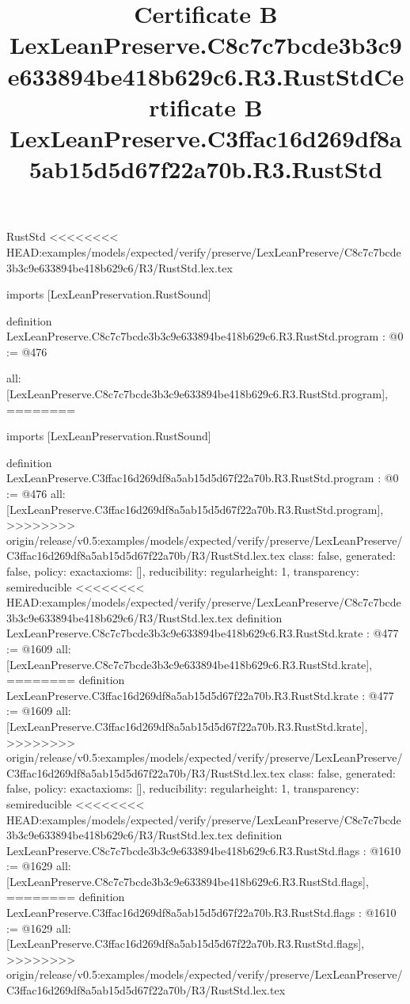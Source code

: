 \begin{lexlean}{RustStd}
<<<<<<<< HEAD:examples/models/expected/verify/preserve/LexLeanPreserve/C8c7c7bcde3b3c9e633894be418b629c6/R3/RustStd.lex.tex
\title{Certificate B LexLeanPreserve.C8c7c7bcde3b3c9e633894be418b629c6.R3.RustStd}
\begin{coremodule}
imports [LexLeanPreservation.RustSound]

definition LexLeanPreserve.C8c7c7bcde3b3c9e633894be418b629c6.R3.RustStd.program : @0 := @476 {
  all: [LexLeanPreserve.C8c7c7bcde3b3c9e633894be418b629c6.R3.RustStd.program],
========
\title{Certificate B LexLeanPreserve.C3ffac16d269df8a5ab15d5d67f22a70b.R3.RustStd}
\begin{coremodule}
imports [LexLeanPreservation.RustSound]

definition LexLeanPreserve.C3ffac16d269df8a5ab15d5d67f22a70b.R3.RustStd.program : @0 := @476 {
  all: [LexLeanPreserve.C3ffac16d269df8a5ab15d5d67f22a70b.R3.RustStd.program],
>>>>>>>> origin/release/v0.5:examples/models/expected/verify/preserve/LexLeanPreserve/C3ffac16d269df8a5ab15d5d67f22a70b/R3/RustStd.lex.tex
  class: false,
  generated: false,
  policy: exact{axioms: []},
  reducibility: regular{height: 1},
  transparency: semireducible
}
<<<<<<<< HEAD:examples/models/expected/verify/preserve/LexLeanPreserve/C8c7c7bcde3b3c9e633894be418b629c6/R3/RustStd.lex.tex
definition LexLeanPreserve.C8c7c7bcde3b3c9e633894be418b629c6.R3.RustStd.krate : @477 := @1609 {
  all: [LexLeanPreserve.C8c7c7bcde3b3c9e633894be418b629c6.R3.RustStd.krate],
========
definition LexLeanPreserve.C3ffac16d269df8a5ab15d5d67f22a70b.R3.RustStd.krate : @477 := @1609 {
  all: [LexLeanPreserve.C3ffac16d269df8a5ab15d5d67f22a70b.R3.RustStd.krate],
>>>>>>>> origin/release/v0.5:examples/models/expected/verify/preserve/LexLeanPreserve/C3ffac16d269df8a5ab15d5d67f22a70b/R3/RustStd.lex.tex
  class: false,
  generated: false,
  policy: exact{axioms: []},
  reducibility: regular{height: 1},
  transparency: semireducible
}
<<<<<<<< HEAD:examples/models/expected/verify/preserve/LexLeanPreserve/C8c7c7bcde3b3c9e633894be418b629c6/R3/RustStd.lex.tex
definition LexLeanPreserve.C8c7c7bcde3b3c9e633894be418b629c6.R3.RustStd.flags : @1610 := @1629 {
  all: [LexLeanPreserve.C8c7c7bcde3b3c9e633894be418b629c6.R3.RustStd.flags],
========
definition LexLeanPreserve.C3ffac16d269df8a5ab15d5d67f22a70b.R3.RustStd.flags : @1610 := @1629 {
  all: [LexLeanPreserve.C3ffac16d269df8a5ab15d5d67f22a70b.R3.RustStd.flags],
>>>>>>>> origin/release/v0.5:examples/models/expected/verify/preserve/LexLeanPreserve/C3ffac16d269df8a5ab15d5d67f22a70b/R3/RustStd.lex.tex
}}}
\end{coremodule}}
\end{coremodule}
\end{lexlean}
